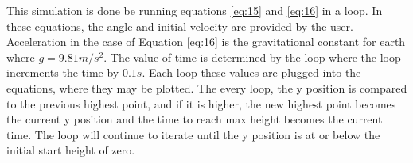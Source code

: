 \documentclass{article}
\begin{document}
This simulation is done be running equations \ref{eq:15} and \ref{eq:16} in a loop. In these equations, the angle and initial velocity are provided by the user. Acceleration in the case of Equation \ref{eq:16} is the gravitational constant for earth where $g = 9.81m/s^2$. The value of time is determined by the loop where the loop increments the time by $0.1s$. Each loop these values are plugged into the equations, where they may be plotted. The every loop, the y position is compared to the previous highest point, and if it is higher, the new highest point becomes the current y position and the time to reach max height becomes the current time. The loop will continue to iterate until the y position is at or below the initial start height of zero.
\end{document}
